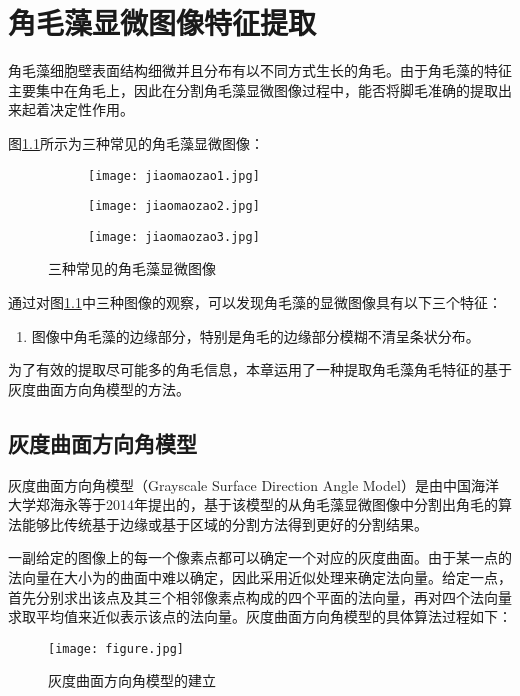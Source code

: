 

\chapter{角毛藻显微图像特征提取}
\label{cha2}
角毛藻细胞壁表面结构细微并且分布有以不同方式生长的角毛。由于角毛藻的特征主要集中在角毛上，因此在分割角毛藻显微图像过程中，能否将脚毛准确的提取出来起着决定性作用。

图\ref{jiaomaozao}所示为三种常见的角毛藻显微图像：
\begin{figure}[h]
  \centering
  \begin{subfigure}{3cm}
    \texttt{[image: jiaomaozao1.jpg]}
  \end{subfigure}
  \hspace{4em}
  \begin{subfigure}{0.2\textwidth}
    \texttt{[image: jiaomaozao2.jpg]}
  \end{subfigure}
  \hspace{4em}
  \begin{subfigure}{0.25\textwidth}
    \texttt{[image: jiaomaozao3.jpg]}
  \end{subfigure}
  \caption{三种常见的角毛藻显微图像}
  \label{jiaomaozao}
\end{figure}

通过对图\ref{jiaomaozao}中三种图像的观察，可以发现角毛藻的显微图像具有以下三个特征：
\begin{enumerate}
，并且其颜色通常与背景十分相近；
；
\item 图像中角毛藻的边缘部分，特别是角毛的边缘部分模糊不清呈条状分布。
\end{enumerate}

为了有效的提取尽可能多的角毛信息，本章运用了一种提取角毛藻角毛特征的基于灰度曲面方向角模型的方法。
\section{灰度曲面方向角模型}
 灰度曲面方向角模型（Grayscale Surface Direction Angle Model）是由中国海洋大学郑海永\cite{zheng2014automatic}等于2014年提出的，基于该模型的从角毛藻显微图像中分割出角毛的算法能够比传统基于边缘或基于区域的分割方法得到更好的分割结果。

一副给定的图像上的每一个像素点都可以确定一个对应的灰度曲面。由于某一点的法向量在大小为的曲面中难以确定，因此采用近似处理来确定法向量。给定一点，首先分别求出该点及其三个相邻像素点构成的四个平面的法向量，再对四个法向量求取平均值来近似表示该点的法向量。灰度曲面方向角模型的具体算法过程如下：
\begin{figure}[ht!]
   \centering
  \texttt{[image: figure.jpg]}
  \caption{灰度曲面方向角模型的建立}
   \label{GSDAM}
 \end{figure}
 
